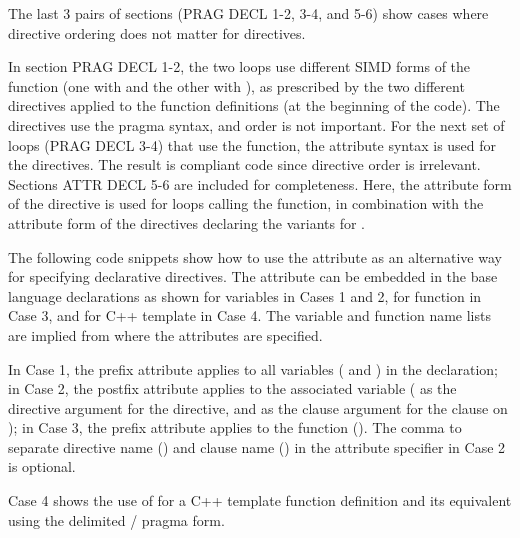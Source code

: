 \begin{ccppspecific}[4ex]
The last 3 pairs of sections (PRAG DECL 1-2, 3-4, and 5-6) show cases where 
directive ordering does not matter for  directives. 

In section PRAG DECL 1-2, the two loops use different SIMD forms of the  function
(one with  and the other with ), 
as prescribed by the two different  directives
applied to the  function definitions (at the beginning of the code). 
The directives use the pragma syntax, and order is not important. 
For the next set of loops 
(PRAG DECL 3-4) that use the  function, the attribute syntax is 
used for the  directives. 
The result is compliant code since directive order is irrelevant.
Sections ATTR DECL 5-6 are included for completeness. Here, the attribute 
form of the  directive is used for loops calling the  function, 
in combination with the attribute form of the  
directives declaring the variants for .


The following code snippets show how to use the  attribute
as an alternative way for specifying declarative directives.
The  attribute can be embedded in the base
language declarations as shown for variables in Cases 1 and 2, 
for function in Case 3, and for C++ template in Case 4.
The variable and function name lists are implied from where
the attributes are specified.

In Case 1, the prefix attribute applies
to all variables ( and ) in the declaration;
in Case 2, the postfix attribute applies to the associated variable
( as the directive argument for the  directive,
and  as the clause argument for the  clause
on );
in Case 3, the prefix attribute applies to the function ().
The comma to separate directive name () and 
clause name () in
the  attribute specifier in Case 2 is optional.

Case 4 shows the use of  for 
a C++ template function definition
and its equivalent using the delimited
/ pragma form.

\end{ccppspecific}
